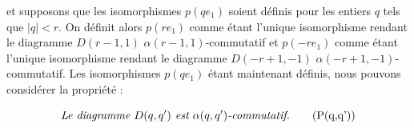 et supposons que les isomorphismes $p(qe_1)$ soient définis pour les
entiers $q$ tels que $|q|<r$. On définit alors $p(re_1)$ comme étant
l'unique isomorphisme rendant le diagramme $D(r-1,1)$
$\alpha(r-1,1)$-commutatif et $p(-re_1)$ comme étant l'unique
isomorphisme rendant le diagramme $D(-r+1,-1)$
$\alpha(-r+1,-1)$-commutatif. Les isomorphismes $p(qe_1)$ étant
maintenant définis, nous pouvons considérer la propriété :

\begin{equation}
  \text{\emph{Le diagramme $D(q,q')$ est $\alpha(q,q')$-commutatif.}}
  \tag{P(q,q')}
\end{equation}
